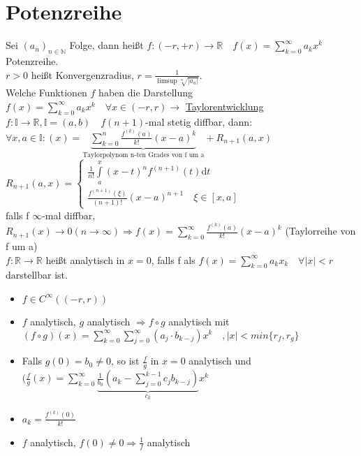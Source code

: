 \documentclass[10pt,a4paper^, twocolumn]{article}
\newcommand{\menge}{\mathbb} %
\renewcommand{\d}{\mathrm{d}} %
\begin{document}
\section{Potenzreihe}
	Sei $(a_n)_{n\in \menge{N}}$ Folge, 
	dann heißt $f:(-r,+r) \rightarrow \menge{R} \quad f(x) = \sum\limits_{k=0}^\infty a_kx^k$ Potenzreihe. \\
	$r > 0$ heißt Konvergenzradius, $r = \frac{1}{\limsup \sqrt[n]{|a_n|}}$. \\
	Welche Funktionen $f$ haben die Darstellung $f(x) = \sum\limits_{k=0}^\infty a_kx^k \quad \forall x \in (-r,r) \rightarrow$ \underline{Taylorentwicklung} \\
	$f: \menge{I} \rightarrow \menge{R}, \menge{I} = (a,b) \quad f (n+1)$-mal stetig diffbar, dann: \\
	$\forall x,a \in \menge{I}: (x) = \underbrace{ \sum\limits_{k=0}^{n} \frac{f^{(k)} (a)}{k!}(x-a)^k }_{\text{Taylorpolynom n-ten Grades von f um a}} + R_{n+1}(a,x)$ \\
	$R_{n+1}(a,x) = \begin{cases}
		\frac{1}{n!} \int\limits_a^x(x-t)^nf^{(n+1)}(t) \d t \\
		\frac{f^{(n+1)}(\xi)}{(n+1)!} (x-a)^{n+1} \quad \xi \in [x,a]
	\end{cases}$ \\
	falls f $\infty$-mal diffbar, $R_{n+1}(x) \rightarrow 0 (n \rightarrow \infty)
	\Rightarrow f(x) = \sum\limits_{k=0}^\infty \frac{f^{(k)}(a)}{k!} (x-a)^k$ \quad (Taylorreihe von f um a) \\
	$f:\menge{R} \rightarrow \menge{R}$ heißt analytisch in $x=0$, falls f als $f(x) = \sum\limits_{k=0}^\infty a_k x_k \quad \forall |x| < r$ darstellbar ist.
	\begin{itemize}
		\item $f \in C^\infty((-r,r))$
		\item $f$ analytisch, $g$ analytisch $\Rightarrow f \circ g$ analytisch mit
			$(f \circ g)(x) = \sum\limits_{k=0}^\infty \sum\limits_{j=0}^\infty (a_j \cdot b_{k-j})x^k \quad , |x| < min\{r_f, r_g\}$
		\item Falls $g(0) = b_0 \neq 0$, so ist $\frac{f}{g}$ in $x=0$ analytisch und
			$(\frac{f}{g}(x) = \sum\limits_{k=0}^\infty \underbrace{\frac{1}{b_0}(a_k - \sum\limits_{j=0}^{k-1} c_jb_{k-j})}_{c_k} x^k$
		\item $a_k = \frac{f^{(k)}(0)}{k!}$
		\item $f$ analytisch, $f(0) \neq 0 \Rightarrow \frac{1}{f}$ analytisch
	\end{itemize}
\end{document}
